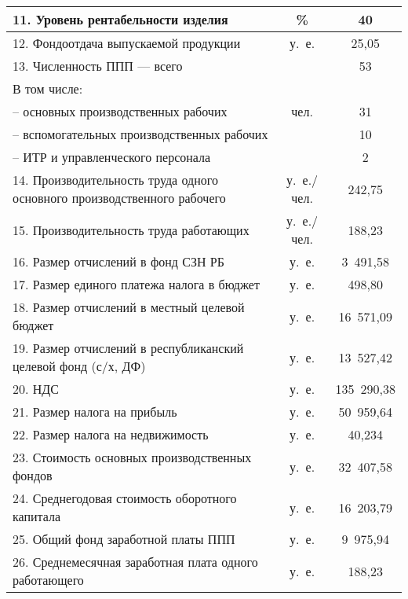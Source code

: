 {\begin{longtable}{| m{10.2cm} | c | c |}
      11. Уровень рентабельности изделия & \% & 40 \\
      \hline

      12. Фондоотдача выпускаемой продукции & у.~е. & 25,05 \\
      \hline

      13. Численность ППП --- всего & \multirow{5}{*}{чел.} & 53 \\
      В том числе: & & \\
      -- основных производственных рабочих & & 31 \\
      -- вспомогательных производственных рабочих & & 10 \\ \hline
      -- ИТР и управленческого персонала & чел. & 2 \\
      \hline

      14. Производительность труда одного \newline
      основного производственного рабочего
      & у.~е./чел. & 242,75 \\
      \hline

      15. Производительность труда работающих
      & у.~е./чел. & 188,23 \\
      \hline

      16. Размер отчислений в фонд СЗН РБ
      & у.~е. & 3~491,58 \\
      \hline

      17. Размер единого платежа налога в бюджет
      & у.~е. & 498,80 \\
      \hline

      18. Размер отчислений в местный целевой бюджет
      & у.~е. & 16~571,09 \\
      \hline

      19. Размер отчислений в республиканский целевой фонд \newline (с/х, ДФ)
      & у.~е. & 13~527,42 \\
      \hline

      20. НДС
      & у.~е. & 135~290,38 \\
      \hline

      21. Размер налога на прибыль
      & у.~е. & 50~959,64 \\
      \hline

      22. Размер налога на недвижимость
      & у.~е. & 40,234 \\
      \hline

      23. Стоимость основных производственных фондов
      & у.~е. & 32~407,58 \\
      \hline

      24. Среднегодовая стоимость оборотного капитала
      & у.~е. & 16~203,79 \\
      \hline

      25. Общий фонд заработной платы ППП
      & у.~е. & 9~975,94 \\
      \hline

      26. Среднемесячная заработная плата одного \newline работающего
      & у.~е. & 188,23 \\
      \hline
\end{longtable}
}
